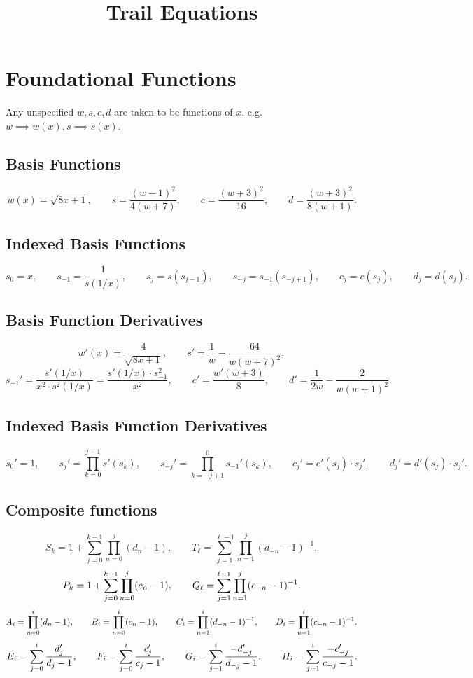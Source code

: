\documentclass{article}
\title{Trail Equations}
\author{}
\date{}
\begin{document}
 

\maketitle 

\section{Foundational Functions}
Any unspecified $w, s, c, d$ are taken to be functions of $x$, e.g. $w\implies w(x), s\implies s(x)$.

\subsection{Basis Functions}
$$w(x)=\sqrt{8x+1},\qquad s=\frac{(w-1)^2}{4(w+7)},\qquad c=\frac{(w+3)^2}{16}, 
\qquad d=\frac{(w+3)^2}{8(w+1)}.$$

\subsection{Indexed Basis Functions}
$$s_0=x, \qquad s_{-1}=\frac{1}{s(1/x)}, \qquad s_j=s(s_{j-1}),\qquad s_{-j}=s_{-1}(s_{-j+1}),\qquad 
c_{j}=c(s_j), \qquad d_j=d(s{_j}).$$

\subsection{Basis Function Derivatives}
$$w'(x)=\frac{4}{\sqrt{8x+1}}, \qquad s'=\frac{1}{w}-\frac{64}{w(w+7)^2},$$
$$s_{-1}'=\frac{s'(1/x)}{x^2\cdot s^2(1/x)} = \frac{s'(1/x)\cdot s_{-1}^2}{x^2}, \qquad
c'=\frac{w'(w+3)}{8},\qquad d'=\frac{1}{2w}-\frac{2}{w(w+1)^2}.$$

\subsection{Indexed Basis Function Derivatives}
$$s_0'=1,\qquad s_j'=\prod_{k=0}^{j-1}s'(s_k), \qquad s_{-j}'=\prod_{k=-j+1}^{0}s_{-1}'(s_k),
\qquad c_j'=c'(s_j)\cdot s_{j}', \qquad d_j'=d'(s_j)\cdot s_j'.$$



\newpage
\subsection{Composite functions}
$$S_k = 1+\sum\limits_{j=0}^{k-1}\prod\limits_{n=0}^{j}(d_n-1), 
\qquad T_\ell = \sum\limits_{j=1}^{\ell-1}\prod\limits_{n=1}^{j}(d_{-n}-1)^{-1},$$
$$P_k = 1+\sum\limits_{j=0}^{k-1}\prod\limits_{n=0}^j(c_n-1),
\qquad Q_\ell = \sum_{j=1}^{\ell-1}\limits\prod_{n=1}^{j}\limits(c_{-n}-1)^{-1}.$$
$$A_i = \prod_{n=0}^{i}\limits(d_n-1), \qquad B_i = \prod_{n=0}^{i}\limits(c_n-1), \qquad
C_i = \prod_{n=1}^{i}\limits(d_{-n}-1)^{-1}, \qquad D_i = \prod_{n=1}^{i}\limits(c_{-n}-1)^{-1}.$$
$$E_i = \sum_{j=0}^{i}\limits\frac{d_j'}{d_j-1}, \qquad F_i = \sum_{j=0}^{i}\limits\frac{c_j'}{c_j-1}, \qquad 
G_i = \sum_{j=1}^{i}\limits\frac{-d_{-j}'}{d_{-j}-1}, \qquad H_i = \sum_{j=1}^{i}\limits\frac{-c_{-j}'}{c_{-j}-1}.$$
\end{document}
